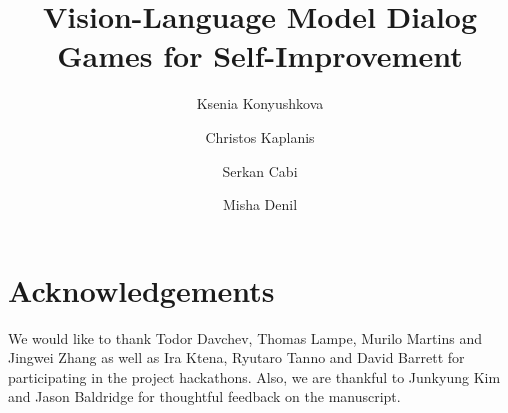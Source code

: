 \documentclass[11pt, a4paper, logo, twocolumn, copyright]{googledeepmind}
\title{Vision-Language Model Dialog Games for Self-Improvement}
\author[1]{Ksenia Konyushkova}
\author[1]{Christos Kaplanis}
\author[1]{Serkan Cabi}
\author[1]{Misha Denil}
\affil[1]{Google DeepMind}
\begin{document}
\maketitle







\section*{Acknowledgements}
We would like to thank Todor Davchev, Thomas Lampe, Murilo Martins and Jingwei Zhang as well as Ira Ktena, Ryutaro Tanno and David Barrett for participating in the project hackathons.
Also, we are thankful to Junkyung Kim and Jason Baldridge for thoughtful feedback on the manuscript.

\newpage




\newpage
\end{document}
